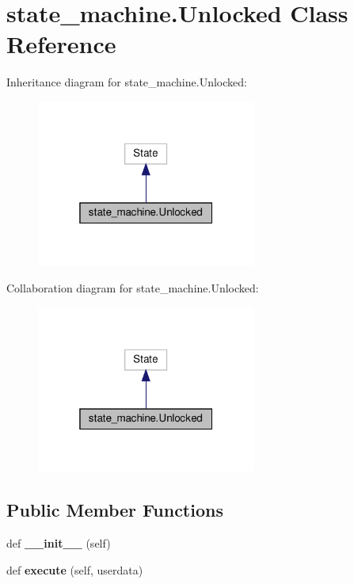 \hypertarget{classstate__machine_1_1Unlocked}{}\section{state\+\_\+machine.\+Unlocked Class Reference}
\label{classstate__machine_1_1Unlocked}


Inheritance diagram for state\+\_\+machine.\+Unlocked\+:
\nopagebreak
\begin{figure}[H]
\begin{center}
\leavevmode
\includegraphics[width=205pt]{classstate__machine_1_1Unlocked__inherit__graph}
\end{center}
\end{figure}


Collaboration diagram for state\+\_\+machine.\+Unlocked\+:
\nopagebreak
\begin{figure}[H]
\begin{center}
\leavevmode
\includegraphics[width=205pt]{classstate__machine_1_1Unlocked__coll__graph}
\end{center}
\end{figure}
\subsection*{Public Member Functions}
\begin{DoxyCompactItemize}
\item 
\mbox{\label{classstate__machine_1_1Unlocked_a98fc7d3f4e0e121b3680ce2ef7c981aa}} 
def {\bfseries \+\_\+\+\_\+init\+\_\+\+\_\+} (self)
\item 
\mbox{\label{classstate__machine_1_1Unlocked_aedea4a1195c913739a334981ff6ccca5}} 
def {\bfseries execute} (self, userdata)
\end{DoxyCompactItemize}


